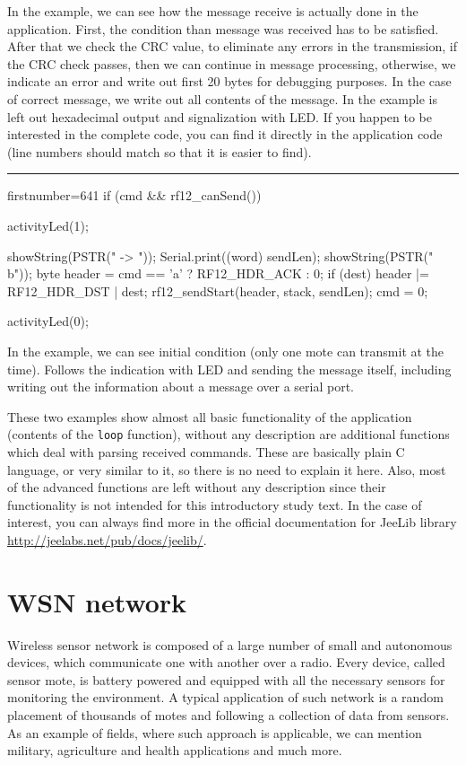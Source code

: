 \documentclass[12pt,titlepage]{article}
\newcommand{\codetitle}[1]{\bigskip \noindent {\scriptsize #1}\hrule}
\begin{document}
        In the example, we can see how the message receive is actually done in the application. First, the condition than message was received has to be satisfied. After that we check the CRC value, to eliminate any errors in the transmission, if the CRC check passes, then we can continue in message processing, otherwise, we indicate an error and write out first 20 bytes for debugging purposes. In the case of correct message, we write out all contents of the message. In the example is left out hexadecimal output and signalization with LED. If you happen to be interested in the complete code, you can find it directly in the application code (line numbers should match so that it is easier to find).

        \codetitle{Simplified example of message send in RF12demo}
        \begin{cppcode*}{firstnumber=641}
        if (cmd && rf12_canSend()) {
            activityLed(1);

            showString(PSTR(" -> "));
            Serial.print((word) sendLen);
            showString(PSTR(" b\n"));
            byte header = cmd == 'a' ? RF12_HDR_ACK : 0;
            if (dest)
                header |= RF12_HDR_DST | dest;
            rf12_sendStart(header, stack, sendLen);
            cmd = 0;

            activityLed(0);
        }

        In the example, we can see initial condition (only one mote can transmit at the time). Follows the indication with LED and sending the message itself, including writing out the information about a message over a serial port.

        These two examples show almost all basic functionality of the application (contents of the \texttt{loop} function), without any description are additional functions which deal with parsing received commands. These are basically plain C language, or very similar to it, so there is no need to explain it here. Also, most of the advanced functions are left without any description since their functionality is not intended for this introductory study text. In the case of interest, you can always find more in the official documentation for JeeLib library \url{http://jeelabs.net/pub/docs/jeelib/}.

        \section{WSN network}
          Wireless sensor network is composed of a large number of small and autonomous devices, which communicate one with another over a radio. Every device, called sensor mote, is battery powered and equipped with all the necessary sensors for monitoring the environment. A typical application of such network is a random placement of thousands of motes and following a collection of data from sensors. As an example of fields, where such approach is applicable, we can mention military, agriculture and health applications and much more.


\end{cppcode*}
\end{document}
